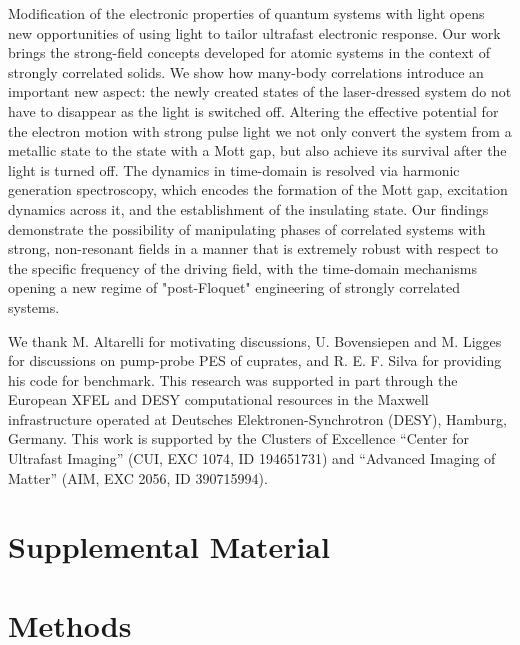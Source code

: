 \documentclass[prb,aps,twocolumn,showpacs,amsmath,amssymb]{revtex4}%
\begin{document}
Modification of the electronic  properties
of quantum systems with light opens new opportunities of
using light to tailor ultrafast electronic response. 
Our work brings the strong-field concepts developed for
atomic systems in the context of strongly correlated
solids. We show how many-body correlations introduce an
important new aspect: the newly created states of the 
laser-dressed system do not have to disappear as the 
light is switched off. Altering the effective 
potential for the electron motion with strong pulse light we not only
convert the system from a metallic state to the state
with a Mott gap, but also achieve its survival after the 
light is turned off. The dynamics in time-domain is 
resolved via harmonic generation spectroscopy, which 
encodes the formation of the Mott gap, 
excitation dynamics across it, and the establishment 
of the insulating state. 
Our findings demonstrate the possibility of  manipulating phases 
of correlated systems with strong, non-resonant  
fields in a manner that is extremely robust with respect to the specific
frequency of the driving field, with the time-domain 
mechanisms opening  a new regime of "post-Floquet" engineering of 
strongly correlated systems.


We thank M. Altarelli for motivating discussions, U. Bovensiepen and M. Ligges for discussions on pump-probe PES of cuprates, and  
R. E. F. Silva for providing his code for benchmark. This research was supported in part through the European XFEL and DESY computational resources in the Maxwell infrastructure operated at Deutsches Elektronen-Synchrotron (DESY), Hamburg, Germany. This work is supported by the Clusters of Excellence “Center for Ultrafast Imaging” (CUI, EXC 1074, ID 194651731) and “Advanced Imaging of Matter” (AIM, EXC 2056, ID 390715994).


%

\section{\label{Supplemental}Supplemental Material}
\section{\label{Methods}Methods}
\end{document}
